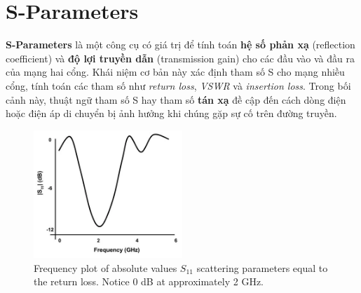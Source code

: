 \chapter{S-Parameters}
    \textbf{S-Parameters} là một công cụ có giá trị để tính toán 
    \textbf{hệ số phản xạ} (reflection coefficient) và \textbf{độ lợi truyền dẫn} (transmission gain)
    cho các đầu vào và đầu ra của mạng hai cổng. 
    Khái niệm cơ bản này xác định tham số S cho 
    mạng nhiều cổng, tính toán các tham số như 
    \textit{return loss}, \textit{VSWR} và 
    \textit{insertion loss}. 
    Trong bối cảnh này, thuật ngữ tham số S hay 
    tham số \textbf{tán xạ} đề cập đến cách dòng điện hoặc 
    điện áp di chuyển bị ảnh hưởng khi chúng gặp sự 
    cố trên đường truyền.
    
    \begin{figure}[h]
        \centering
        \includegraphics[width=0.5\textwidth]{figures/freq_plot.png}
        \caption{Frequency plot of absolute values $S_{11}$ scattering parameters equal to the return loss. Notice 0 dB at approximately 2 GHz.}
        \label{fig:freq_plot}
    \end{figure}

